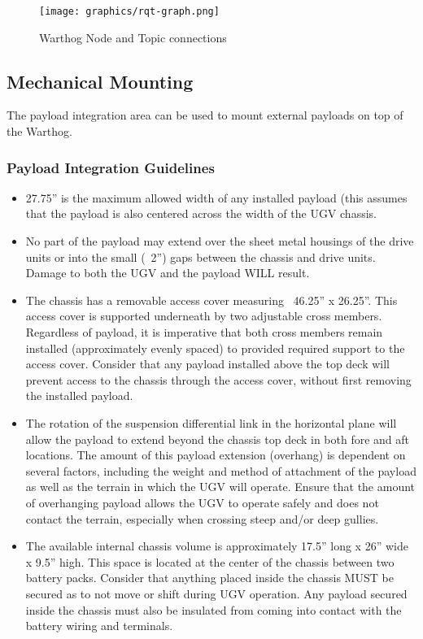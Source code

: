 \documentclass[]{clearpath-latex/clearpath-manual}
\begin{document}
\begin{figure}[!htb]
  \centering
  \texttt{[image: graphics/rqt-graph.png]}
  \caption{Warthog Node and Topic connections}
  \label{fig:rqt-graph}
\end{figure}
\clearpage

\pagebreak[4]
\subsection{Mechanical Mounting}
\label{mechanical}

The payload integration area can be used to mount external payloads on top of the Warthog.


\subsubsection{Payload Integration Guidelines}

\begin{itemize}[nolistsep]

\item 27.75” is the maximum allowed width of any installed payload (this assumes that the payload is also centered across the width of the UGV chassis.

\item  No part of the payload may extend over the sheet metal housings of the drive units or into the small (~2”) gaps between the chassis and drive units. Damage to both the UGV and the payload WILL result.

\item  The chassis has a removable access cover measuring ~46.25” x 26.25”. This access cover is supported underneath by two adjustable cross members. Regardless of payload, it is imperative that both cross members remain installed (approximately evenly spaced) to provided required support to the access cover. Consider that any payload installed above the top deck will prevent access to the chassis through the access cover, without first removing the installed payload.

\item  The rotation of the suspension differential link in the horizontal plane will allow the payload to extend beyond the chassis top deck in both fore and aft locations. The amount of this payload extension (overhang) is dependent on several factors, including the weight and method of attachment of the payload as well as the terrain in which the UGV will operate. Ensure that the amount of overhanging payload allows the UGV to operate safely and does not contact the terrain, especially when crossing steep and/or deep gullies.

\item  The available internal chassis volume is approximately 17.5” long x 26” wide x 9.5” high. This space is located at the center of the chassis between two battery packs. Consider that anything placed inside the chassis MUST be secured as to not move or shift during UGV operation. Any payload secured inside the chassis must also be insulated from coming into contact with the battery wiring and terminals.

\end{itemize}
\end{document}
